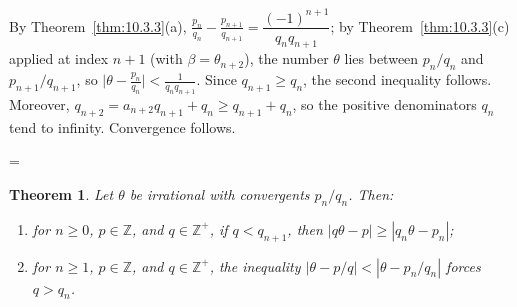 \documentclass[11pt]{article}
\makeatletter
\theoremstyle{ntstyle}
\newtheorem{theorem}{Theorem}[subsection]
\let\nt@closedisplay\]
\def\nt@guardedclose{\@ifnextchar\par{\nt@closeafterpar}{\@ifnextchar\end{\postdisplaypenalty\@M\nt@closedisplay}{\nt@closedisplay}}}
\def\nt@closeafterpar\par{\@ifnextchar\par{\nt@closeafterpar}{\@ifnextchar\end{\postdisplaypenalty\@M\nt@closedisplay\par}{\nt@closedisplay\par}}}
\renewenvironment{proof}[1][\proofname]{\par
  \pushQED{\qed}\normalfont\topsep\medskipamount\edef\nt@afterproof{\@endparpenalty=\the\@endparpenalty\relax}\@beginparpenalty\@M\@endparpenalty\@M\let\]\nt@guardedclose\trivlist\item[]\textit{#1\@addpunct{.}} \ignorespaces}{\ifvmode\addpenalty\@M\fi\popQED\nt@afterproof\endtrivlist\@endpefalse}
\makeatother
\begin{document}
\begin{proof} By Theorem~\ref{thm:10.3.3}(a),
	$\tfrac{p_n}{q_n}-\tfrac{p_{n+1}}{q_{n+1}}=\dfrac{(-1)^{n+1}}{q_nq_{n+1}}$;
	by Theorem~\ref{thm:10.3.3}(c) applied at index $n+1$ (with $\beta=\theta_{n+2}$), the number $\theta$ lies between $p_n/q_n$ and $p_{n+1}/q_{n+1}$, so
	$\big|\theta-\tfrac{p_n}{q_n}\big|<\tfrac{1}{q_nq_{n+1}}$. Since
	$q_{n+1}\ge q_n$, the second inequality follows. Moreover,
	$q_{n+2}=a_{n+2}q_{n+1}+q_n\ge q_{n+1}+q_n$, so the positive
	denominators $q_n$ tend to infinity. Convergence follows.

\end{proof}
\begin{theorem}\label{thm:10.3.5} Let $\theta$
	be irrational with convergents $p_n/q_n$. Then:
	\begin{enumerate}[label={\alph*)}]
		\item for $n\ge0$, $p\in\mathbb{Z}$, and $q\in\mathbb{Z}^+$, if
		      $q<q_{n+1}$, then $|q\theta-p|\ge|q_n\theta-p_n|$;
		\item for $n\ge1$, $p\in\mathbb{Z}$, and $q\in\mathbb{Z}^+$,
		      the inequality $|\theta-p/q|<|\theta-p_n/q_n|$ forces $q>q_n$.
	\end{enumerate}

\end{theorem}
\end{document}
